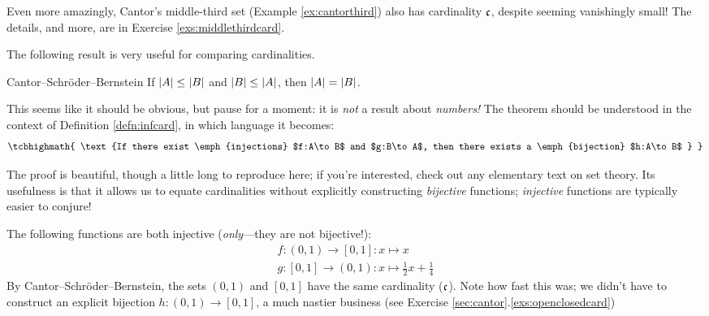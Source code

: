 Even more amazingly, Cantor's middle-third set (Example \ref{ex:cantorthird}) also has cardinality $\mathfrak{c}$, despite seeming vanishingly small! The details, and more, are in Exercise \ref{exs:middlethirdcard}.


\goodbreak




The following result is very useful for comparing cardinalities. %

\begin{thm}{Cantor--Schröder--Bernstein}{}
	If $\left| A\right|\le\left| B\right|$ and $\left| B\right|\le\left| A\right|$, then $\left| A\right|=\left| B\right|$.
\end{thm}

This seems like it should be obvious, but pause for a moment: it is \emph{not} a result about \emph{numbers!} The theorem should be understood in the context of Definition \ref{defn:infcard}, in which language it becomes:
\[
	\tcbhighmath{
		\text{%
			If there exist \emph{injections} $f:A\to B$ and $g:B\to A$, then there exists a \emph{bijection} $h:A\to B$
		}
	}
\]

The proof is beautiful, though a little long to reproduce here; if you're interested, check out any elementary text on set theory. Its usefulness is that it allows us to equate cardinalities without explicitly constructing \emph{bijective} functions; \emph{injective} functions are typically easier to conjure!


\begin{example}{}{}
	The following functions are both injective (\emph{only}---they are not bijective!):
	\begin{gather*}
		f:(0,1)\to[0,1]:x\mapsto x \tag{$\range(f)=(0,1)\subsetneq[0,1]$}\\
		g:[0,1]\to (0,1):x\mapsto \frac 12x+\frac 14 \tag{$\range(g)=[\tfrac 14,\tfrac 34]\subsetneq(0,1)$}
	\end{gather*}
	By Cantor--Schröder--Bernstein, the sets $(0,1)$ and $[0,1]$ have the same cardinality ($\mathfrak{c}$). Note how fast this was; we didn't have to construct an explicit bijection $h:(0,1)\to[0,1]$, a much nastier business (see Exercise \ref*{sec:cantor}.\ref{exs:openclosedcard})
\end{example}


